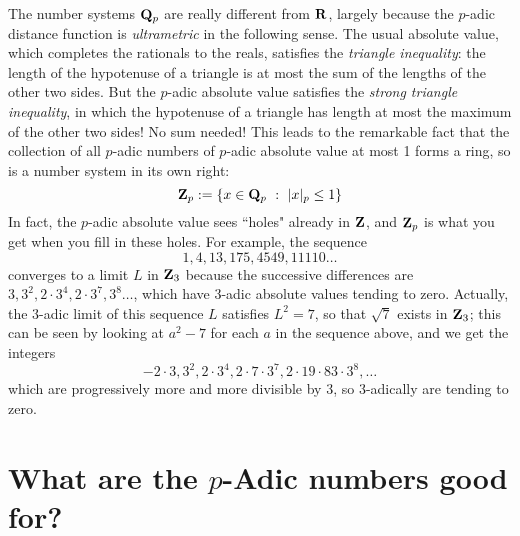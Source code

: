 \documentclass[11pt,oneside]{amsart}
\begin{document}
The number systems $\mathbf{Q}_p$ are really different from $\mathbf{R}$, largely because the $p$-adic distance function is {\em ultrametric}
in the following sense.
The usual absolute value, which completes the rationals to the reals, satisfies the {\em triangle inequality}: 
the length of the hypotenuse of a triangle is at most the sum of the lengths of the other two sides.  But the $p$-adic
absolute value satisfies the {\em strong triangle inequality}, in which the hypotenuse of a triangle has length at most the
maximum of the other two sides!  No sum needed!  This leads to the remarkable fact that the collection of all
$p$-adic numbers of $p$-adic absolute value at most 1 forms a ring, so is a number system in its own right:
$$
	\mathbf{Z}_p:=\{x\in \mathbf{Q}_p \ :\ |x|_p \le 1\}
$$
In fact, the $p$-adic absolute value sees ``holes" already in $\mathbf{Z}$, and $\mathbf{Z}_p$ is what you get when you fill in these holes.
For example, the sequence
$$
	1, 4, 13, 175, 4549, 11110\ldots
$$
converges to a limit $L$ in $\mathbf{Z}_3$ because the successive differences are $3,3^2,2\cdot 3^4, 2\cdot 3^7, 3^8\ldots$,
which have $3$-adic absolute values tending to zero.  Actually, the $3$-adic limit of this sequence $L$ satisfies $L^2 = 7$,
so that $\sqrt{7}$ exists in $\mathbf{Z}_3$; this can be seen by looking at $a^2 - 7$ for each $a$ in the sequence above, and we get the
integers
$$
	-2\cdot 3, 3^2, 2\cdot 3^4, 2\cdot 7\cdot 3^7,2\cdot19\cdot 83\cdot 3^8,\ldots
$$
which are progressively more and more divisible by $3$, so $3$-adically are tending to zero.


\section{What are the $p$-Adic numbers good for?}
\end{document}
